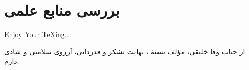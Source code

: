 \chapter{بررسی منابع علمی}

{\Huge\latin\centering
	Enjoy Your \TeX ing$ \ldots $
	
}

از جناب وفا خلیقی، مؤلف بستهٔ
\lr{\XePersian}،
نهایت تشکر و قدردانی، آرزوی سلامتی و شادی دارم.